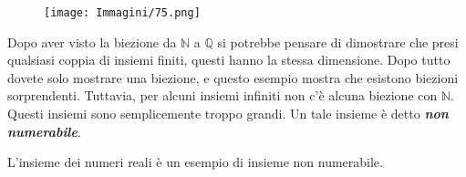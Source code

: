 \documentclass{article}
\begin{document}
\begin{figure}[H]
    \centering
    \texttt{[image: Immagini/75.png]}
    \label{figura-4.14}
\end{figure}

Dopo aver visto la biezione da $\mathbb{N}$ a $\mathbb{Q}$ si potrebbe pensare di dimostrare che presi qualsiasi coppia di insiemi finiti, questi hanno la stessa dimensione.
Dopo tutto dovete solo mostrare una biezione, e questo esempio mostra che esistono biezioni sorprendenti.
Tuttavia, per alcuni insiemi infiniti non c'è alcuna biezione con $\mathbb{N}$.
Questi insiemi sono semplicemente troppo grandi.
\newline
Un tale insieme è detto \textbf{\textit{non numerabile}}.

L'insieme dei numeri reali è un esempio di insieme non numerabile.
\end{document}

